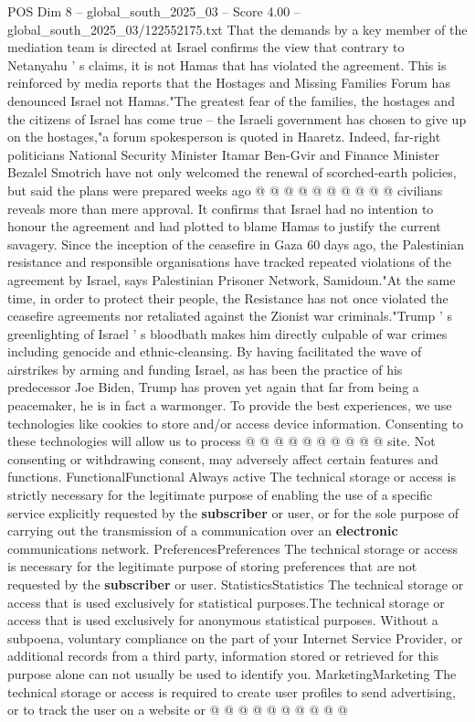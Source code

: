 \begin{textsample}{POS Dim 8 – global\_south\_2025\_03 – Score 4.00 – global\_south\_2025\_03/122552175.txt}
That the demands by a key member of the mediation team is directed at Israel confirms the view that contrary to Netanyahu ' s claims, it is not Hamas that has violated the agreement.
This is reinforced by media reports that the Hostages and Missing Families Forum has denounced Israel not Hamas."The greatest fear of the families, the hostages and the citizens of Israel has come true -- the Israeli government has chosen to give up on the hostages,"a forum spokesperson is quoted in Haaretz.
Indeed, far-right politicians National Security Minister Itamar Ben-Gvir and Finance Minister Bezalel Smotrich have not only welcomed the renewal of scorched-earth policies, but said the plans were prepared weeks ago @ @ @ @ @ @ @ @ @ @ civilians reveals more than mere approval.
It confirms that Israel had no intention to honour the agreement and had plotted to blame Hamas to justify the current savagery.
Since the inception of the ceasefire in Gaza 60 days ago, the Palestinian resistance and responsible organisations have tracked repeated violations of the agreement by Israel, says Palestinian Prisoner Network, Samidoun."At the same time, in order to protect their people, the Resistance has not once violated the ceasefire agreements nor retaliated against the Zionist war criminals."Trump ' s greenlighting of Israel ' s bloodbath makes him directly culpable of war crimes including genocide and ethnic-cleansing.
By having facilitated the wave of airstrikes by arming and funding Israel, as has been the practice of his predecessor Joe Biden, Trump has proven yet again that far from being a peacemaker, he is in fact a warmonger.
To provide the best experiences, we use technologies like cookies to store and/or access device information.
Consenting to these technologies will allow us to process @ @ @ @ @ @ @ @ @ @ site.
Not consenting or withdrawing consent, may adversely affect certain features and functions.
FunctionalFunctional Always active The technical storage or access is strictly necessary for the legitimate purpose of enabling the use of a specific service explicitly requested by the \textbf{subscriber} or user, or for the sole purpose of carrying out the transmission of a communication over an \textbf{electronic} communications network.
PreferencesPreferences The technical storage or access is necessary for the legitimate purpose of storing preferences that are not requested by the \textbf{subscriber} or user.
StatisticsStatistics The technical storage or access that is used exclusively for statistical purposes.The technical storage or access that is used exclusively for anonymous statistical purposes.
Without a subpoena, voluntary compliance on the part of your Internet Service Provider, or additional records from a third party, information stored or retrieved for this purpose alone can not usually be used to identify you.
MarketingMarketing The technical storage or access is required to create user profiles to send advertising, or to track the user on a website or @ @ @ @ @ @ @ @ @ @

\end{textsample}
